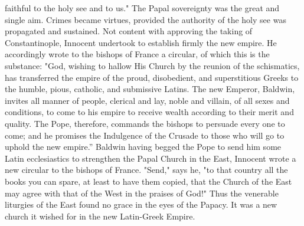 faithful to the holy see and to us." The Papal sovereignty was the great and single aim. Crimes became virtues, provided the authority of the holy see was propagated and sustained. Not content with approving the taking of Constantinople, Innocent undertook to establish firmly the new empire. He accordingly wrote to the bishops of France a circular, of which this is the substance: "God, wishing to hallow His Church by the reunion of the schismatics, has transferred the empire of the proud, disobedient, and superstitious Greeks to the humble, pious, catholic, and submissive Latins. The new Emperor, Baldwin, invites all manner of people, clerical and lay, noble and villain, of all sexes and conditions, to come to his empire to receive wealth according to their merit and quality. The Pope, therefore, commands the bishops to persuade every one to come; and he promises the Indulgence of the Crusade to those who will go to uphold the new empire.” Baldwin having begged the Pope to send him some Latin ecclesiastics to strengthen the Papal Church in the East, Innocent wrote a new circular to the bishops of France. "Send," says he, "to that country all the books you can spare, at least to have them copied, that the Church of the East may agree with that of the West in the praises of God!" Thus the venerable liturgies of the East found no grace in the eyes of the Papacy. It was a new church it wished for in the new Latin-Greek Empire.

